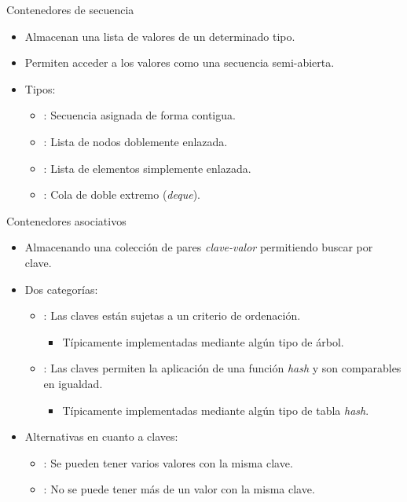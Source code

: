 \begin{frame}[t]{Contenedores de secuencia}
\begin{itemize}
  \item Almacenan una lista de valores de un determinado tipo.
  \item Permiten acceder a los valores como una secuencia semi-abierta.
  \vfill\pause
  \item Tipos:
    \begin{itemize}
      \item {}: Secuencia asignada de forma contigua.
      \item {}: Lista de nodos doblemente enlazada.
      \item {}: Lista de elementos simplemente enlazada.
      \item {}: Cola de doble extremo (\emph{deque}).
    \end{itemize}
\end{itemize}
\end{frame}

\begin{frame}[t]{Contenedores asociativos}
\begin{itemize}
  \item Almacenando una colección de pares \emph{clave-valor} permitiendo buscar por clave.
  \vfill\pause
  \item Dos categorías:
    \begin{itemize}
      \item {}: Las claves están sujetas a un criterio de ordenación.
        \begin{itemize}
          \item Típicamente implementadas mediante algún tipo de árbol.
        \end{itemize}
      \item {}: Las claves permiten la aplicación de una función \emph{hash}
            y son comparables en igualdad.
        \begin{itemize}
          \item Típicamente implementadas mediante algún tipo de tabla \emph{hash}.
        \end{itemize}
    \end{itemize}
  \vfill\pause
  \item Alternativas en cuanto a claves:
    \begin{itemize}
      \item {}: Se pueden tener varios valores con la misma clave.
      \item {}: No se puede tener más de un valor con la misma clave.
    \end{itemize}
\end{itemize}
\end{frame}

